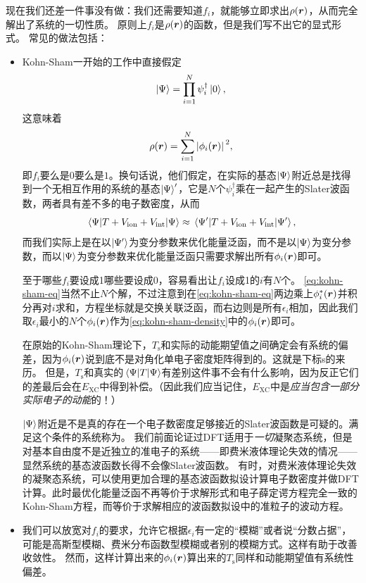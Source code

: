 现在我们还差一件事没有做：我们还需要知道$f_i$，就能够立即求出$\rho(\vb*{r})$，从而完全解出了系统的一切性质。
原则上$f_i$是$\rho(\vb*{r})$的函数，但是我们写不出它的显式形式。
常见的做法包括：
\begin{itemize}
    \item Kohn-Sham一开始的工作中直接假定
    \begin{equation}
        \ket{\Psi} = \prod_{i=1}^N \psi^\dagger_i \ket{0},
        \label{eq:v-representable-wavefunction}
    \end{equation}
    这意味着
    \begin{equation}
        \rho(\vb*{r}) = \sum_{i=1}^N \abs*{\phi_i(\vb*{r})}^2,
    \end{equation}
    即$f_i$要么是$0$要么是$1$。换句话说，他们假定，在实际的基态$\ket{\Psi}$附近总是找得到一个无相互作用的系统的基态$\ket{\Psi}'$，它是$N$个$\psi^\dagger_i$乘在一起产生的Slater波函数，两者具有差不多的电子数密度，从而
    \[
        \mel{\Psi}{T + V_\text{ion} + V_\text{int}}{\Psi} \approx \mel{\Psi'}{T + V_\text{ion} + V_\text{int}}{\Psi'},
    \]
    而我们实际上是在以$\ket{\Psi'}$为变分参数来优化能量泛函，而不是以$\ket{\Psi}$为变分参数，而以$\ket{\Psi}$为变分参数来优化能量泛函只需要求解出所有$\phi_i(\vb*{r})$即可。
    
    至于哪些$f_i$要设成1哪些要设成0，容易看出让$f_i$设成1的$i$有$N$个。
    \eqref{eq:kohn-sham-eq}当然不止$N$个解，不过注意到在\eqref{eq:kohn-sham-eq}两边乘上$\phi_i^*(\vb*{r})$并积分再对$i$求和，方程坐标就是交换关联泛函，而右边则是所有$\epsilon_i$相加，因此我们取$\epsilon_i$最小的$N$个$\phi_i(\vb*{r})$作为\eqref{eq:kohn-sham-density}中的$\phi_i(\vb*{r})$即可。

    在原始的Kohn-Sham理论下，$T_\text{s}$和实际的动能期望值之间确定会有系统的偏差，因为$\phi_i(\vb*{r})$说到底不是对角化单电子密度矩阵得到的。这就是下标s的来历。
    但是，$T_\text{s}$和真实的$\mel*{\Psi}{T}{\Psi}$有差别这件事不会有什么影响，因为反正它们的差最后会在$E_\text{XC}$中得到补偿。（因此我们应当记住，$E_\text{XC}$中是\emph{应当包含一部分实际电子的动能}的！）

    $\ket{\Psi}$附近是不是真的存在一个电子数密度足够接近的Slater波函数是可疑的。满足这个条件的系统称为。
    我们前面论证过DFT适用于\emph{一切}凝聚态系统，但是对基本自由度不是近独立的准电子的系统——即费米液体理论失效的情况——显然系统的基态波函数长得不会像Slater波函数。
    有时，对费米液体理论失效的凝聚态系统，可以使用更加合理的基态波函数拟设计算电子数密度并做DFT计算。此时最优化能量泛函不再等价于求解形式和电子薛定谔方程完全一致的Kohn-Sham方程，而等价于求解相应的波函数拟设中的准粒子的波动方程。
    \item 我们可以放宽对$f_i$的要求，允许它根据$\epsilon_i$有一定的“模糊”或者说“分数占据”，可能是高斯型模糊、费米分布函数型模糊或者别的模糊方式。这样有助于改善收敛性。
    然而，这样计算出来的$\phi_i(\vb*{r})$算出来的$T_\text{s}$同样和动能期望值有系统性偏差。


\end{itemize}
